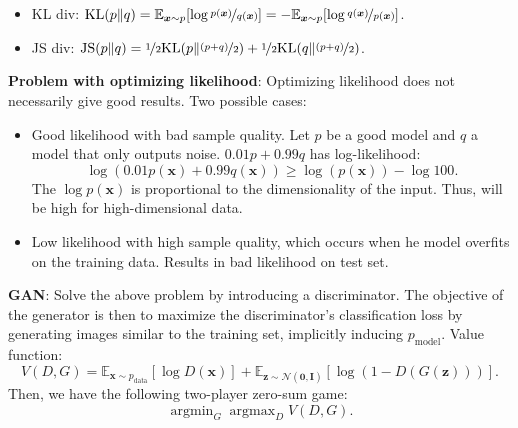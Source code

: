 \documentclass{article}
\DeclareMathOperator*{\argmax}{argmax}
\DeclareMathOperator*{\argmin}{argmin}
\newcommand{\lft}{\mathopen{}\mathclose\bgroup\left}
\newcommand{\rgt}{\aftergroup\egroup\right}
\newcommand{\E}{\mathbb{E}}
\renewcommand{\vec}[1]{\bm{#1}}
\newcommand{\mat}[1]{\bm{#1}}
\newenvironment{topic}[1]
{\textbf{\sffamily \colorbox{black}{\rlap{\textbf{\textcolor{white}{#1}}}\hspace{\linewidth}\hspace{-2\fboxsep}}} \\ \vspace{0.2cm}}
{}
\begin{document}
\begin{multicols*}{2}
\begin{topic}{Normalizing flow}
    \end{topic}

    \begin{topic}{Generative adversarial network}

        \begin{itemize}
            \item KL div: $\mathrm{KL}(p \lVert q) = \E_{\vec{x} \sim p} \lft[ \log \nicefrac{p(\vec{x})}{q(\vec{x})}
                          \rgt] = - \E_{\vec{x} \sim p} \lft[ \log \nicefrac{q(\vec{x})}{p(\vec{x})} \rgt]$.
            \item JS div: $\mathrm{JS}(p \lVert q) = \nicefrac{1}{2} \mathrm{KL}\lft(p \middle\lVert \nicefrac{(p +
                              q)}{2} \rgt) + \nicefrac{1}{2} \mathrm{KL}\lft( q \middle\lVert \nicefrac{(p + q)}{2} \rgt)$.
        \end{itemize}

        \textbf{Problem with optimizing likelihood}: Optimizing likelihood does not necessarily give good results. Two possible cases:
        \begin{itemize}
            \item Good likelihood with bad sample quality. Let $p$ be a good model and $q$ a model that only outputs
                  noise. $0.01p + 0.99q$ has log-likelihood: \[
                      \log(0.01p(\vec{x}) + 0.99q(\vec{x})) \geq \log(p(\vec{x})) - \log 100.
                  \]
                  The $\log p(\vec{x})$ is proportional to the dimensionality of the input. Thus, will be high for
                  high-dimensional data.

            \item Low likelihood with high sample quality, which occurs when he model overfits on the training data.
                  Results in bad likelihood on test set.

        \end{itemize}

        \textbf{GAN}: Solve the above problem by introducing a discriminator. The objective of the
        generator is then to maximize the discriminator's classification loss by generating images
        similar to the training set, implicitly inducing $p_{\mathrm{model}}$. Value function: \[
            V(D, G) = \E_{\vec{x} \sim p_{\mathrm{data}}}[\log D(\vec{x})] + \E_{\vec{z} \sim \mathcal{N}(\vec{0}, \mat{I})} [\log (1 - D(G(\vec{z})))].
        \]
        Then, we have the following two-player zero-sum game: \[
            \argmin_G \argmax_D V(D,G).
        \]


\end{topic}
\end{multicols*}
\end{document}
